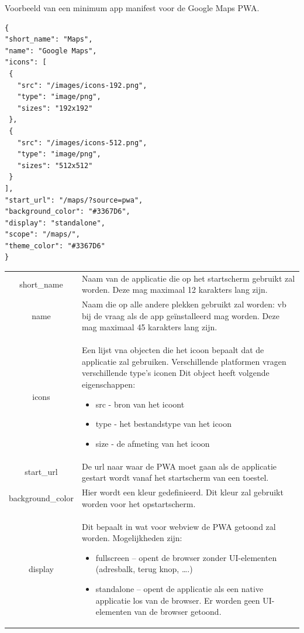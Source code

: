 	Voorbeeld van een minimum app manifest voor de Google Maps PWA.
	
\begin{lstlisting}
{
"short_name": "Maps",
"name": "Google Maps",
"icons": [
 {
   "src": "/images/icons-192.png",
   "type": "image/png",
   "sizes": "192x192"
 },
 {
   "src": "/images/icons-512.png",
   "type": "image/png",
   "sizes": "512x512"
 }
],
"start_url": "/maps/?source=pwa",
"background_color": "#3367D6",
"display": "standalone",
"scope": "/maps/",
"theme_color": "#3367D6"
}
\end{lstlisting}
	
	
		\begin{table}[H]
			\centering
			\begin{tabular}{cp{12cm}}
	     		short\_name & Naam van de applicatie die op het startscherm gebruikt zal worden. Deze mag maximaal 12 karakters lang zijn. \\
	     		name & Naam die op alle andere plekken gebruikt zal worden: vb bij de vraag als de app geïnstalleerd mag worden. Deze mag maximaal 45 karakters lang zijn. \\
	     		icons & Een lijst vna objecten die het icoon bepaalt dat de applicatie zal gebruiken.
Verschillende platformen vragen verschillende type's iconen Dit object heeft volgende eigenschappen:
		     		\begin{itemize}
			    		  \item src - bron van het icoont
			    		  \item type - het bestandstype van het icoon
			    		  \item size - de afmeting van het icoon
	     			\end{itemize} \\
	     		start\_url & De url naar waar de PWA moet gaan als de applicatie gestart wordt vanaf het startscherm van een toestel.\\
	     		background\_color & Hier wordt een kleur gedefinieerd. Dit kleur zal gebruikt worden voor het opstartscherm. \\
	     		display & Dit bepaalt in wat voor webview de PWA getoond zal worden. Mogelijkheden zijn:
		     		\begin{itemize}
			     		  \item fullscreen – opent de browser zonder UI-elementen (adresbalk, terug knop, ….)
			     		  \item standalone – opent de applicatie als een native applicatie los van de browser. Er worden geen UI-elementen van de browser getoond.

\end{itemize}
\end{tabular}
\end{table}
